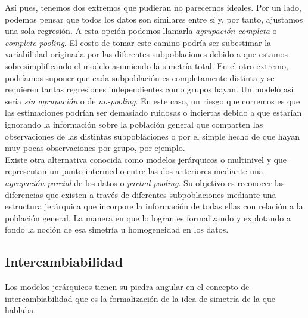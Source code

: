 Así pues, tenemos dos extremos que pudieran no parecernos ideales. Por un lado, podemos pensar que todos los datos son similares entre sí y, por tanto, ajustamos una sola regresión. A esta opción podemos llamarla \textit{agrupación completa} o \textit{complete-pooling}. El costo de tomar este camino podría ser subestimar la variabilidad originada por las diferentes subpoblaciones debido a que estamos sobresimplificando el modelo asumiendo la simetría total. En el otro extremo, podríamos suponer que cada subpoblación es completamente distinta y se requieren tantas regresiones independientes como grupos hayan. Un modelo así sería \textit{sin agrupación} o de \textit{no-pooling}. En este caso, un riesgo que corremos es que las estimaciones podrían ser demasiado ruidosas o inciertas debido a que estarían ignorando la información sobre la población general que comparten las observaciones de las distintas subpoblaciones o por el simple hecho de que hayan muy pocas observaciones por grupo, por ejemplo.\\ 

Existe otra alternativa conocida como modelos jerárquicos o multinivel y que representan un punto intermedio entre las dos anteriores mediante una \textit{agrupación parcial} de los datos o \textit{partial-pooling}. Su objetivo es reconocer las diferencias que existen a través de diferentes subpoblaciones mediante una estructura jerárquica que incorpore la información de todas ellas con relación a la población general. La manera en que lo logran es formalizando y explotando a fondo la noción de esa simetría u homogeneidad en los datos.  

\subsection{Intercambiabilidad}

Los modelos jerárquicos tienen su piedra angular en el concepto de intercambiabilidad que es la formalización de la idea de simetría de la que hablaba.\\ 


